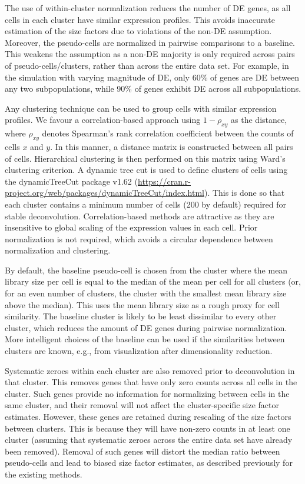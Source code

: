 \documentclass{article}
\begin{document}
The use of within-cluster normalization reduces the number of DE genes, as all cells in each cluster have similar expression profiles.
This avoids inaccurate estimation of the size factors due to violations of the non-DE assumption.
Moreover, the pseudo-cells are normalized in pairwise comparisons to a baseline.
This weakens the assumption as a non-DE majority is only required across pairs of pseudo-cells/clusters, rather than across the entire data set.
For example, in the simulation with varying magnitude of DE, only 60\% of genes are DE between any two subpopulations, while 90\% of genes exhibit DE across all subpopulations.

Any clustering technique can be used to group cells with similar expression profiles.
We favour a correlation-based approach using $1-\rho_{xy}$ as the distance, where $\rho_{xy}$ denotes Spearman's rank correlation coefficient between the counts of cells $x$ and $y$.
In this manner, a distance matrix is constructed between all pairs of cells.
Hierarchical clustering is then performed on this matrix using Ward's clustering criterion.
A dynamic tree cut is used to define clusters of cells using the dynamicTreeCut package v1.62 (\url{https://cran.r-project.org/web/packages/dynamicTreeCut/index.html}).
This is done so that each cluster contains a minimum number of cells (200 by default) required for stable deconvolution.
Correlation-based methods are attractive as they are insensitive to global scaling of the expression values in each cell.
Prior normalization is not required, which avoids a circular dependence between normalization and clustering.

By default, the baseline pseudo-cell is chosen from the cluster where the mean library size per cell is equal to the median of the mean per cell for all clusters
    (or, for an even number of clusters, the cluster with the smallest mean library size above the median).
This uses the mean library size as a rough proxy for cell similarity.
The baseline cluster is likely to be least dissimilar to every other cluster, which reduces the amount of DE genes during pairwise normalization.
More intelligent choices of the baseline can be used if the similarities between clusters are known, e.g., from visualization after dimensionality reduction.

Systematic zeroes within each cluster are also removed prior to deconvolution in that cluster.
This removes genes that have only zero counts across all cells in the cluster.
Such genes provide no information for normalizing between cells in the same cluster, and their removal will not affect the cluster-specific size factor estimates.
However, these genes are retained during rescaling of the size factors between clusters.
This is because they will have non-zero counts in at least one cluster (assuming that systematic zeroes across the entire data set have already been removed).
Removal of such genes will distort the median ratio between pseudo-cells and lead to biased size factor estimates, as described previously for the existing methods.
\end{document}
